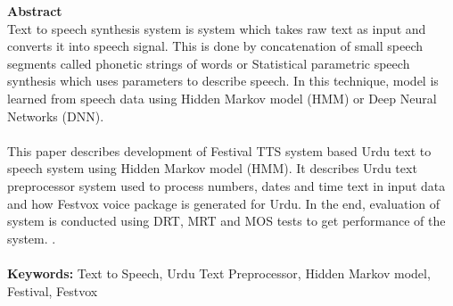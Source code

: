 
{\LARGE\textbf {Abstract}} \\ %
Text to speech synthesis system is system which takes raw text as input and converts it into speech signal.
This is done by concatenation of small speech segments called phonetic strings of words or 
Statistical parametric speech synthesis which uses parameters to describe speech. In
this technique, model is learned from speech data using Hidden Markov model (HMM) or Deep Neural Networks (DNN).
\\ \\
This paper describes development of Festival TTS system based Urdu text to speech system using Hidden Markov model (HMM). It describes Urdu text preprocessor 
system used to process numbers, dates and time text in input data and how Festvox voice package is generated for Urdu. In the end, evaluation of 
system is conducted using DRT, MRT and MOS tests to get performance of the system. 
. \\ \\
\textbf{Keywords:}
Text to Speech, Urdu Text Preprocessor, Hidden Markov model, Festival, Festvox


